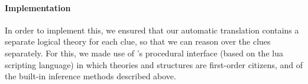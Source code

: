
\paragraph{Implementation}
In order to implement this, we ensured that our automatic translation contains a separate logical theory for each clue, so that we can reason over the clues separately. For this, we made use of \idp's procedural interface (based on the lua scripting language) in which theories and structures are first-order citizens, and of the built-in inference methods described above. 
% 

